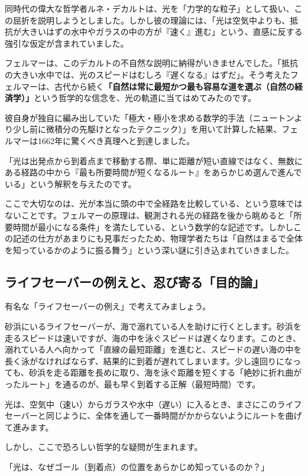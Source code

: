 同時代の偉大な哲学者ルネ・デカルトは、光を「力学的な粒子」として扱い、この屈折を説明しようとしました。しかし彼の理論には、「光は空気中よりも、抵抗が大きいはずの水中やガラスの中の方が『速く』進む」という、直感に反する強引な仮定が含まれていました。

フェルマーは、このデカルトの不自然な説明に納得がいきませんでした。「抵抗の大きい水中では、光のスピードはむしろ『遅くなる』はずだ」。そう考えたフェルマーは、古代から続く\textbf{「自然は常に最短かつ最も容易な道を選ぶ（自然の経済学）」}という哲学的な信念を、光の軌道に当てはめてみたのです。

彼自身が独自に編み出していた「極大・極小を求める数学的手法（ニュートンより少し前に微積分の先駆けとなったテクニック）」を用いて計算した結果、フェルマーは1662年に驚くべき真理へと到達しました。

「光は出発点から到着点まで移動する際、単に距離が短い直線ではなく、無数にある経路の中から『最も所要時間が短くなるルート』をあらかじめ選んで進んでいる」という解釈を与えたのです。

ここで大切なのは、光が本当に頭の中で全経路を比較している、という意味ではないことです。フェルマーの原理は、観測される光の経路を後から眺めると「所要時間が最小になる条件」を満たしている、という数学的な記述です。しかしこの記述の仕方があまりにも見事だったため、物理学者たちは「自然はまるで全体を知っているかのように振る舞う」という深い謎に引き込まれていきました。

\subsection{ライフセーバーの例えと、忍び寄る「目的論」}

有名な「ライフセーバーの例え」で考えてみましょう。

砂浜にいるライフセーバーが、海で溺れている人を助けに行くとします。砂浜を走るスピードは速いですが、海の中を泳ぐスピードは遅くなります。このとき、溺れている人へ向かって「直線の最短距離」を進むと、スピードの遅い海の中を長く泳がなければならず、結果的に到着が遅れてしまいます。少し遠回りになっても、砂浜を走る距離を長めに取り、海を泳ぐ距離を短くする「絶妙に折れ曲がったルート」を通るのが、最も早く到着する正解（最短時間）です。

光は、空気中（速い）からガラスや水中（遅い）に入るとき、まさにこのライフセーバーと同じように、全体を通して一番時間がかからないようにルートを曲げて進みます。

しかし、ここで恐ろしい哲学的な疑問が生まれます。

「光は、なぜゴール（到着点）の位置をあらかじめ知っているのか？」

